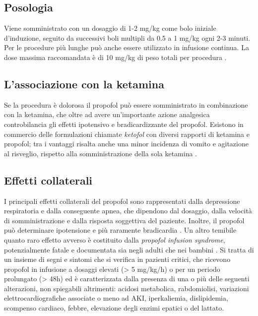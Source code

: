 \subsection*{Posologia}

Viene somministrato con un dosaggio di 1-2 mg/kg come bolo iniziale d'induzione, seguito da successivi boli multipli da 0.5 a 1 mg/kg ogni 2-3 minuti. Per le procedure più lunghe può anche essere utilizzato in infusione continua.
La dose massima raccomandata è di 10 mg/kg di peso totali per procedura \cite{Simeupsedazione}.

\subsection*{L'associazione con la ketamina}

Se la procedura è dolorosa il propofol può essere somministrato in combinazione con la ketamina, che oltre ad avere un'importante azione analgesica controbilancia gli effetti ipotensivo e bradicardizzante del propofol. Esistono in commercio delle formulazioni chiamate \emph{ketofol} con diversi rapporti di ketamina e propofol; tra i vantaggi risalta anche una minor incidenza di vomito e agitazione al risveglio, rispetto alla somministrazione della sola ketamina \cite{Simeupsedazione}. %

\subsection*{Effetti collaterali}

I principali effetti collaterali del propofol sono rappresentati dalla depressione respiratoria e dalla conseguente apnea, che dipendono dal dosaggio, dalla velocità di somministrazione e dalla risposta soggettiva del paziente. Inoltre, il propofol può determinare ipotensione e più raramente bradicardia \cite{propofolsafety2010}.
Un altro temibile quanto raro effetto avverso è costituito dalla \emph{propofol infusion syndrome}, potenzialmente fatale e documentata sia negli adulti che nei bambini \cite{Propofolinfusionsyndrome2019}. Si tratta di un insieme di segni e sintomi che si verifica in pazienti critici, che ricevono propofol in infusione a dosaggi elevati (> 5 mg/kg/h) o per un periodo prolungato (> 48h) ed è caratterizzata dalla presenza di una o più delle seguenti alterazioni, non spiegabili altrimenti: acidosi metabolica, rabdomiolisi, variazioni elettrocardiografiche associate o meno ad AKI, iperkaliemia, dislipidemia, scompenso cardiaco, febbre, elevazione degli enzimi epatici o del lattato. 

